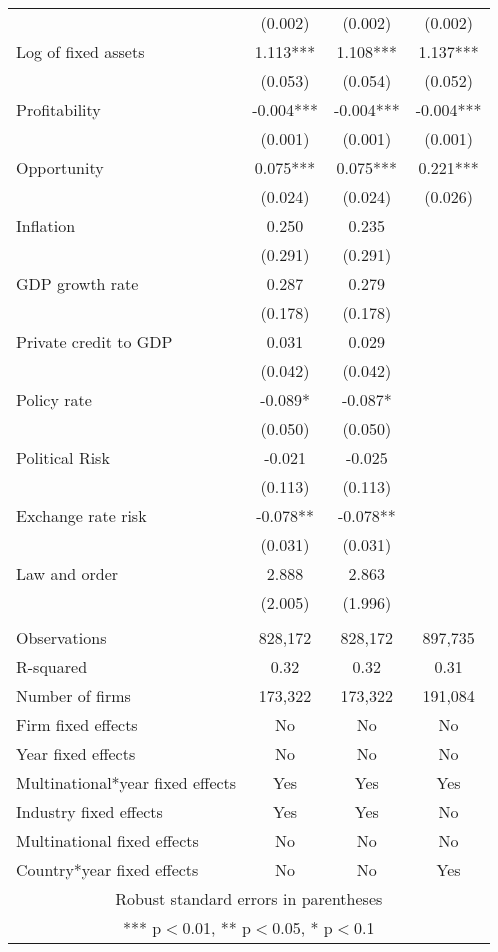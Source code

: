 \begin{tabular}{lccc}
 & (0.002) & (0.002) & (0.002) \\
Log of fixed assets & 1.113*** & 1.108*** & 1.137*** \\
 & (0.053) & (0.054) & (0.052) \\
Profitability & -0.004*** & -0.004*** & -0.004*** \\
 & (0.001) & (0.001) & (0.001) \\
Opportunity & 0.075*** & 0.075*** & 0.221*** \\
 & (0.024) & (0.024) & (0.026) \\
Inflation & 0.250 & 0.235 &  \\
 & (0.291) & (0.291) &  \\
GDP growth rate & 0.287 & 0.279 &  \\
 & (0.178) & (0.178) &  \\
Private credit to GDP & 0.031 & 0.029 &  \\
 & (0.042) & (0.042) &  \\
Policy rate & -0.089* & -0.087* &  \\
 & (0.050) & (0.050) &  \\
Political Risk & -0.021 & -0.025 &  \\
 & (0.113) & (0.113) &  \\
Exchange rate risk & -0.078** & -0.078** &  \\
 & (0.031) & (0.031) &  \\
Law and order & 2.888 & 2.863 &  \\
 & (2.005) & (1.996) &  \\
 &  &  &  \\
Observations & 828,172 & 828,172 & 897,735 \\
R-squared & 0.32 & 0.32 & 0.31 \\
Number of firms & 173,322 & 173,322 & 191,084 \\
Firm fixed effects & No & No & No \\
Year fixed effects & No & No & No \\
Multinational*year fixed effects & Yes & Yes & Yes \\
Industry fixed effects & Yes & Yes & No \\
Multinational fixed effects & No & No & No \\
 Country*year fixed effects & No & No & Yes \\ \hline
\multicolumn{4}{c}{ Robust standard errors in parentheses} \\
\multicolumn{4}{c}{ *** p$<$0.01, ** p$<$0.05, * p$<$0.1} \\
\end{tabular}
